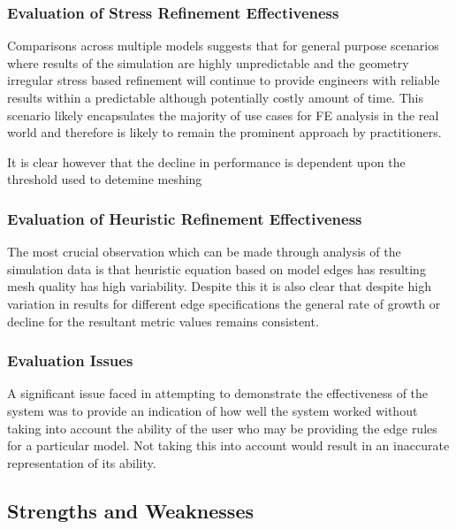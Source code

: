 



\subsubsection{Evaluation of Stress Refinement Effectiveness}
Comparisons across multiple models suggests that for general purpose scenarios where results of the simulation are highly unpredictable and the geometry irregular stress based refinement will continue to provide engineers with reliable results within a predictable although potentially costly amount of time. This scenario likely encapsulates the majority of use cases for FE analysis in the real world and therefore is likely to remain the prominent approach by practitioners.

It is clear however that the decline in performance is dependent upon the threshold used to detemine meshing

\subsubsection{Evaluation of Heuristic Refinement Effectiveness}
The most crucial observation which can be made through analysis of the simulation data is that heuristic equation based on model edges has resulting mesh quality has high variability. Despite this it is also clear that despite high variation in results for different edge specifications the general rate of growth or decline for the resultant metric values remains consistent.


\subsubsection{Evaluation Issues}
A significant issue faced in attempting to demonstrate the effectiveness of the system was to provide an indication of how well the system worked without taking into account the ability of the user who may be providing the edge rules for a particular model. Not taking this into account would result in an inaccurate representation of its ability.

\subsection{Strengths and Weaknesses}

